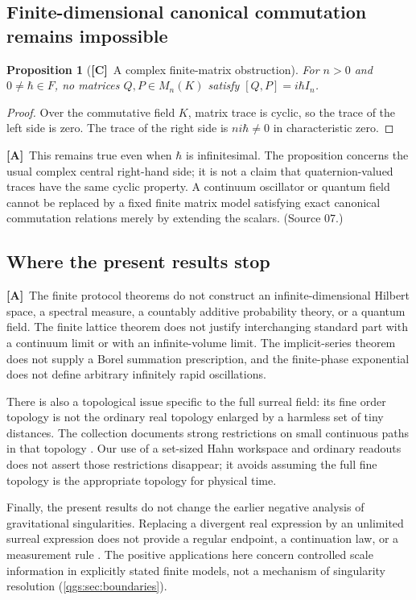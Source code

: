 \documentclass[11pt,oneside]{article}
\numberwithin{equation}{section}
\theoremstyle{plain}
\newtheorem{proposition}[proposition]{Proposition}
\theoremstyle{definition}
\theoremstyle{remark}
\newcommand{\TC}{\textcolor{TierC}{\textsf{\bfseries[C]}}}
\newcommand{\TA}{\textcolor{TierA}{\textsf{\bfseries[A]}}}
\begin{document}
\subsection{Finite-dimensional canonical commutation remains impossible}
\begin{proposition}[\TC\ A complex finite-matrix obstruction]\label{qgs:prop:CCR}
For $n>0$ and $0\ne\hbar\in F$, no matrices $Q,P\in M_n(K)$ satisfy $[Q,P]=i\hbar I_n$.
\end{proposition}
\begin{proof}
Over the commutative field $K$, matrix trace is cyclic, so the trace of the left side is zero. The trace of the right side is $ni\hbar\ne0$ in characteristic zero.
\end{proof}

\TA\ This remains true even when $\hbar$ is infinitesimal. The proposition concerns the usual complex central right-hand side; it is not a claim that quaternion-valued traces have the same cyclic property. A continuum oscillator or quantum field cannot be replaced by a fixed finite matrix model satisfying exact canonical commutation relations merely by extending the scalars. (Source 07.)

\subsection{Where the present results stop}\label{qgs:sec:stop}
\TA\ The finite protocol theorems do not construct an infinite-dimensional Hilbert space, a spectral measure, a countably additive probability theory, or a quantum field. The finite lattice theorem does not justify interchanging standard part with a continuum limit or with an infinite-volume limit. The implicit-series theorem does not supply a Borel summation prescription, and the finite-phase exponential does not define arbitrary infinitely rapid oscillations.

There is also a topological issue specific to the full surreal field: its fine order topology is not the ordinary real topology enlarged by a harmless set of tiny distances. The collection documents strong restrictions on small continuous paths in that topology \cite{repo,repoPhysics}. Our use of a set-sized Hahn workspace and ordinary readouts does not assert those restrictions disappear; it avoids assuming the full fine topology is the appropriate topology for physical time.

Finally, the present results do not change the earlier negative analysis of gravitational singularities. Replacing a divergent real expression by an unlimited surreal expression does not provide a regular endpoint, a continuation law, or a measurement rule \cite{repoPhysics}. The positive applications here concern controlled scale information in explicitly stated finite models, not a mechanism of singularity resolution (\cref{qgs:sec:boundaries}).
\end{document}
